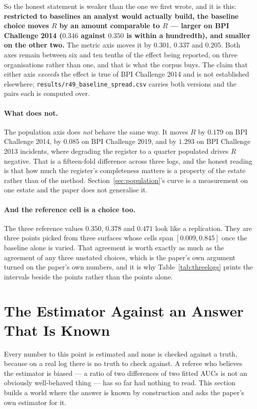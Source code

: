 \documentclass[preprint,12pt]{elsarticle}
\begin{document}
So the honest statement is weaker than the one we first wrote, and it is this:
\textbf{restricted to baselines an analyst would actually build, the baseline
choice moves $R$ by an amount comparable to $R$ --- larger on BPI Challenge
2014 ($0.346$ against $0.350$ is within a hundredth), and smaller on the other
two.} The metric axis moves it by $0.301$, $0.337$ and $0.205$. Both axes
remain between six and ten tenths of the effect being reported, on three
organisations rather than one, and that is what the corpus buys. The claim
that either axis \emph{exceeds} the effect is true of BPI Challenge 2014 and
is not established elsewhere; \texttt{results/r49\_baseline\_spread.csv}
carries both versions and the pairs each is computed over.

\paragraph{What does not.} The population axis does \emph{not} behave the same
way. It moves $R$ by $0.179$ on BPI Challenge 2014, by $0.085$ on BPI
Challenge 2019, and by $1.293$ on BPI Challenge 2013 incidents, where
degrading the register to a quarter populated drives $R$ negative. That is a
fifteen-fold difference across three logs, and the honest reading is that how
much the register's completeness matters is a property of the estate rather
than of the method. Section~\ref{sec:population}'s curve is a measurement on
one estate and the paper does not generalise it.

\paragraph{And the reference cell is a choice too.} The three reference values
$0.350$, $0.378$ and $0.471$ look like a replication. They are three points
picked from three surfaces whose cells span $[0.009, 0.845]$ once the baseline
alone is varied. That agreement is worth exactly as much as the agreement of
any three unstated choices, which is the paper's own argument turned on the
paper's own numbers, and it is why Table~\ref{tab:threelogs} prints the
intervals beside the points rather than the points alone.

\section{The Estimator Against an Answer That Is Known}
\label{sec:sim}

Every number to this point is estimated and none is checked against a truth,
because on a real log there is no truth to check against. A referee who
believes the estimator is biased --- a ratio of two differences of two fitted
AUCs is not an obviously well-behaved thing --- has so far had nothing to read.
This section builds a world where the answer is known by construction and asks
the paper's own estimator for it.
\end{document}
